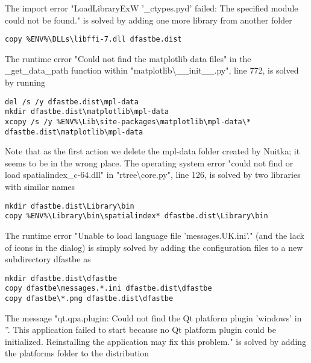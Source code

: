 The import error "LoadLibraryExW '\_ctypes.pyd' failed: The specified module could not be found." is solved by adding one more library from another folder

\begin{Verbatim}
copy %ENV%\DLLs\libffi-7.dll dfastbe.dist
\end{Verbatim}

The runtime error "Could not find the matplotlib data files" in the \_get\_data\_path function within "matplotlib\textbackslash{}\_\_init\_\_.py", line 772, is solved by running

\begin{Verbatim}
del /s /y dfastbe.dist\mpl-data
mkdir dfastbe.dist\matplotlib\mpl-data
xcopy /s /y %ENV%\Lib\site-packages\matplotlib\mpl-data\* dfastbe.dist\matplotlib\mpl-data
\end{Verbatim}

Note that as the first action we delete the mpl-data folder created by Nuitka; it seems to be in the wrong place.
The operating system error "could not find or load spatialindex\_c-64.dll" in "rtree\textbackslash{}core.py", line 126, is solved by two libraries with similar names

\begin{Verbatim}
mkdir dfastbe.dist\Library\bin
copy %ENV%\Library\bin\spatialindex* dfastbe.dist\Library\bin
\end{Verbatim}

%

The runtime error "Unable to load language file 'messages.UK.ini'." (and the lack of icons in the dialog) is simply solved by adding the configuration files to a new subdirectory dfastbe as

\begin{Verbatim}
mkdir dfastbe.dist\dfastbe
copy dfastbe\messages.*.ini dfastbe.dist\dfastbe
copy dfastbe\*.png dfastbe.dist\dfastbe
\end{Verbatim}

The message "qt.qpa.plugin: Could not find the Qt platform plugin 'windows' in ''. This application failed to start because no Qt platform plugin could be initialized. Reinstalling the application may fix this problem." is solved by adding the platforms folder to the distribution

